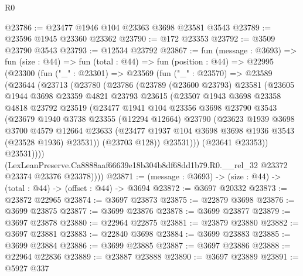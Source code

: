 \begin{lexlean}{R0}
\begin{coremodule}
@23786 := @23477 @1946 @104 @23363 @3698 @23581 @3543
@23789 := @23596 @1945 @23360 @23362
@23790 := @172 @23353
@23792 := @3509 @23790 @3543
@23793 := @12534 @23792
@23867 := fun (message : @3693) =>
  fun (size : @44) =>
  fun (total : @44) =>
  fun (position : @44) =>
  @22995
    (@23300
      (fun ("_" : @23301) =>
      @23569
        (fun ("_" : @23570) =>
        @23589
          (@23644
            (@23713
              (@23780
                (@23786
                  (@23789
                    (@23600 @23793)
                    @23581
                    (@23605
                      @1944
                      @3698
                      @23359
                      @4821
                      @23793
                      @23615
                      (@23507
                        @1943
                        @3698
                        @23358
                        @4818
                        @23792
                        @23519
                        (@23477
                          @1941
                          @104
                          @23356
                          @3698
                          @23790
                          @3543
                          (@23679
                            @1940
                            @3738
                            @23355
                            (@12294 @12664)
                            @23790
                            (@23623
                              @1939
                              @3698
                              @3700
                              @4579
                              @12664
                              @23633
                              (@23477 @1937 @104 @3698 @3698 @1936 @3543 (@23528 @1936) @23531))
                            (@23703 @128))
                          @23531)))
                    (@23641 @23353))
                  @23531))))
          (LexLeanPreserve.Ca8888aaf66639e18b304b8df68dd1b79.R0.__rel_32
            @23372
            @23374
            @23376
            @23378))))
@23871 := (message : @3693) -> (size : @44) -> (total : @44) -> (offset : @44) -> @3694
@23872 := @3697 @20332
@23873 := @23872 @22965
@23874 := @3697 @23873
@23875 := @22879 @3698
@23876 := @3699 @23875
@23877 := @3699 @23876
@23878 := @3699 @23877
@23879 := @3697 @23878
@23880 := @22964 @22875
@23881 := @23879 @23880
@23882 := @3697 @23881
@23883 := @22840 @3698
@23884 := @3699 @23883
@23885 := @3699 @23884
@23886 := @3699 @23885
@23887 := @3697 @23886
@23888 := @22964 @22836
@23889 := @23887 @23888
@23890 := @3697 @23889
@23891 := @5927 @337

\end{coremodule}
\end{lexlean}
